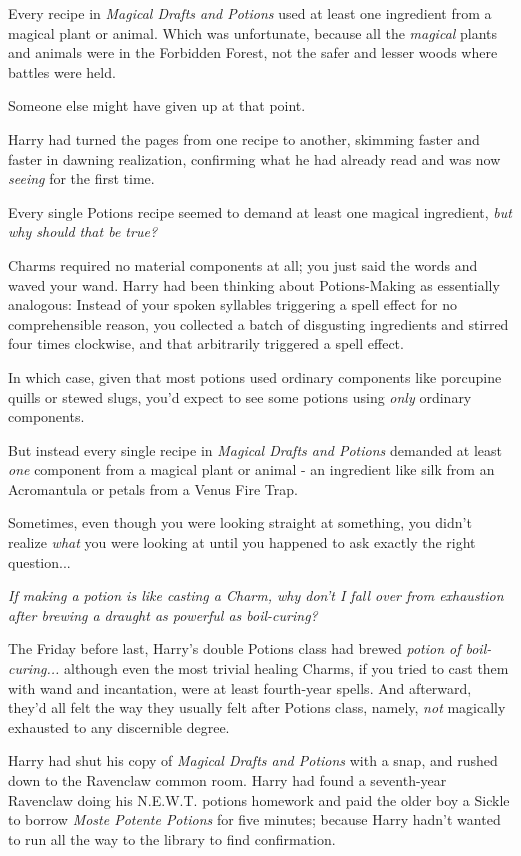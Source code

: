 Every recipe in \emph{Magical Drafts and Potions} used at least one
ingredient from a magical plant or animal. Which was unfortunate,
because all the \emph{magical} plants and animals were in the Forbidden
Forest, not the safer and lesser woods where battles were held.

Someone else might have given up at that point.

Harry had turned the pages from one recipe to another, skimming faster
and faster in dawning realization, confirming what he had already read
and was now \emph{seeing} for the first time.

Every single Potions recipe seemed to demand at least one magical
ingredient, \emph{but why should that be true?}

Charms required no material components at all; you just said the words
and waved your wand. Harry had been thinking about Potions-Making as
essentially analogous: Instead of your spoken syllables triggering a
spell effect for no comprehensible reason, you collected a batch of
disgusting ingredients and stirred four times clockwise, and that
arbitrarily triggered a spell effect.

In which case, given that most potions used ordinary components like
porcupine quills or stewed slugs, you'd expect to see some potions using
\emph{only} ordinary components.

But instead every single recipe in \emph{Magical Drafts and Potions}
demanded at least \emph{one} component from a magical plant or animal -
an ingredient like silk from an Acromantula or petals from a Venus Fire
Trap.

Sometimes, even though you were looking straight at something, you
didn't realize \emph{what} you were looking at until you happened to ask
exactly the right question...

\emph{If making a potion is like casting a Charm, why don't I fall over
from exhaustion after brewing a draught as powerful as boil-curing?}

The Friday before last, Harry's double Potions class had brewed
\emph{potion of boil-curing...} although even the most trivial
healing Charms, if you tried to cast them with wand and incantation,
were at least fourth-year spells. And afterward, they'd all felt the way
they usually felt after Potions class, namely, \emph{not} magically
exhausted to any discernible degree.

Harry had shut his copy of \emph{Magical Drafts and Potions} with a
snap, and rushed down to the Ravenclaw common room. Harry had found a
seventh-year Ravenclaw doing his N.E.W.T. potions homework and paid the
older boy a Sickle to borrow \emph{Moste Potente Potions} for five
minutes; because Harry hadn't wanted to run all the way to the library
to find confirmation.

